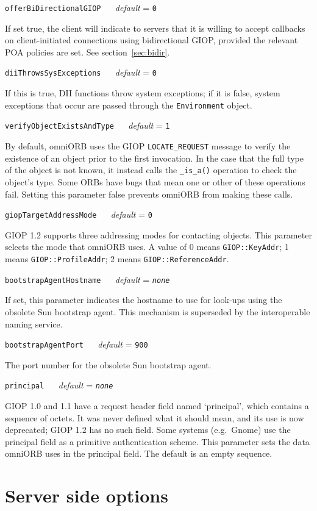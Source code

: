 \documentclass[11pt,twoside,a4paper]{book}
\makeatletter
\newcommand{\type}[1]{\texttt{#1}}
\newcommand{\code}[1]{\texttt{#1}}
\newcommand{\op}[1]{\texttt{#1()}}
\newcommand{\confopt}[2]
  {\vspace{\baselineskip}\par\noindent\code{#1} ~~ \textit{default} =
   \code{#2}\\[-1ex]\@afterheading}
\makeatother
\begin{document}
\confopt{offerBiDirectionalGIOP}{0}

If set true, the client will indicate to servers that it is willing to
accept callbacks on client-initiated connections using bidirectional
GIOP, provided the relevant POA policies are set. See
section~\ref{sec:bidir}.


\confopt{diiThrowsSysExceptions}{0}

If this is true, DII functions throw system exceptions; if it is
false, system exceptions that occur are passed through the
\type{Environment} object.


\confopt{verifyObjectExistsAndType}{1}

By default, omniORB uses the GIOP \code{LOCATE\_REQUEST} message to
verify the existence of an object prior to the first invocation. In
the case that the full type of the object is not known, it instead
calls the \op{\_is\_a} operation to check the object's type. Some ORBs
have bugs that mean one or other of these operations fail. Setting
this parameter false prevents omniORB from making these calls.


\confopt{giopTargetAddressMode}{0}

GIOP 1.2 supports three addressing modes for contacting objects. This
parameter selects the mode that omniORB uses. A value of 0 means
\code{GIOP::KeyAddr}; 1 means \code{GIOP::ProfileAddr}; 2 means
\code{GIOP::ReferenceAddr}.


\confopt{bootstrapAgentHostname}{\textit{none}}

If set, this parameter indicates the hostname to use for look-ups
using the obsolete Sun bootstrap agent. This mechanism is superseded
by the interoperable naming service.


\confopt{bootstrapAgentPort}{900}

The port number for the obsolete Sun bootstrap agent.


\confopt{principal}{\textit{none}}

GIOP 1.0 and 1.1 have a request header field named `principal', which
contains a sequence of octets. It was never defined what it should
mean, and its use is now deprecated; GIOP 1.2 has no such field. Some
systems (e.g.\ Gnome) use the principal field as a primitive
authentication scheme. This parameter sets the data omniORB uses in
the principal field. The default is an empty sequence.



\section{Server side options}
\end{document}
